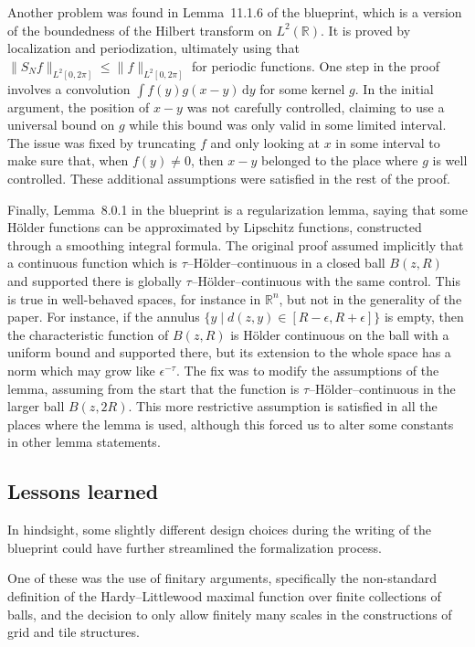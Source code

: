\documentclass[12pt, reqno]{amsart}
\newcommand*{\ud}{\, \mathrm{d}}
\newcommand*{\real}{\mathbb{R}} %
\theoremstyle{definition}
\theoremstyle{plain}
\begin{document}
Another problem was found in Lemma~11.1.6 of the blueprint, which is a version of the boundedness of the
Hilbert transform on $L^2(\real)$. It is proved by localization and
periodization, ultimately using that $\|S_N f\|_{L^2[0,2\pi]} \leq
\|f\|_{L^2[0,2\pi]}$ for periodic functions. One step in the proof
involves a convolution $\int f(y) g(x-y) \ud y$ for some kernel $g$. In
the initial argument, the position of $x-y$ was not carefully
controlled, claiming to use a universal bound on $g$ while this bound
was only valid in some limited interval. The issue was fixed by
truncating $f$ and only looking at $x$ in some interval to make sure
that, when $f(y)\ne 0$, then $x-y$ belonged to the place where $g$ is
well controlled. These additional assumptions were satisfied in the
rest of the proof.

Finally, Lemma~8.0.1 in the blueprint is a regularization lemma, saying that
some Hölder functions can be approximated by Lipschitz functions,
constructed through a smoothing integral formula. The original proof
assumed implicitly that a continuous function which is
$\tau$--Hölder--continuous in a closed ball $B(z,R)$ and supported
there is globally $\tau$--Hölder--continuous with the same control.
This is true in well-behaved spaces, for instance in $\real^n$, but not
in the generality of the paper. For instance, if the annulus $\{y \mid
d(z,y) \in [R-\epsilon, R+\epsilon]\}$ is empty, then the
characteristic function of $B(z, R)$ is Hölder continuous on the ball
with a uniform bound and supported there, but its extension to the
whole space has a norm which may grow like $\epsilon^{-\tau}$. The fix
was to modify the assumptions of the lemma, assuming from the start
that the function is $\tau$--Hölder--continuous in the larger ball
$B(z, 2R)$. This more restrictive assumption is satisfied in all the
places where the lemma is used, although this forced us to alter
some constants in other lemma statements.

\subsection{Lessons learned}\label{subsec:blueprint_lessons}
In hindsight, some slightly different design choices during
the writing of the blueprint could have further streamlined the formalization process.

One of these was the use of finitary arguments, specifically the non-standard
definition of the Hardy--Littlewood maximal function over finite collections of balls,
and the decision to only allow finitely many scales in the constructions of grid
and tile structures.
\end{document}
